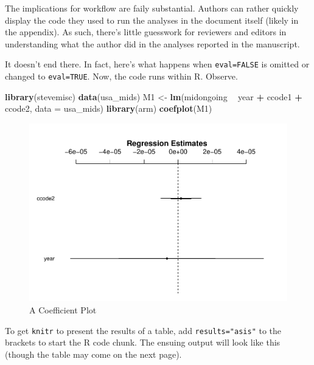 \documentclass[11pt,]{article}
\newenvironment{Shaded}{\begin{snugshade}}{\end{snugshade}}
\newcommand{\DataTypeTok}[1]{\textcolor[rgb]{0.13,0.29,0.53}{#1}}
\newcommand{\KeywordTok}[1]{\textcolor[rgb]{0.13,0.29,0.53}{\textbf{#1}}}
\newcommand{\NormalTok}[1]{#1}
\newcommand{\OperatorTok}[1]{\textcolor[rgb]{0.81,0.36,0.00}{\textbf{#1}}}
\newcommand{\StringTok}[1]{\textcolor[rgb]{0.31,0.60,0.02}{#1}}
\begin{document}
The implications for workflow are faily substantial. Authors can rather
quickly display the code they used to run the analyses in the document
itself (likely in the appendix). As such, there's little guesswork for
reviewers and editors in understanding what the author did in the
analyses reported in the manuscript.

It doesn't end there. In fact, here's what happens when
\texttt{eval=FALSE} is omitted or changed to \texttt{eval=TRUE}. Now,
the code runs within R. Observe.

\begin{Shaded}
\begin{Highlighting}[]
\KeywordTok{library}\NormalTok{(stevemisc)}
\KeywordTok{data}\NormalTok{(usa_mids)}
\NormalTok{M1 <-}\StringTok{ }\KeywordTok{lm}\NormalTok{(midongoing }\OperatorTok{~}\StringTok{ }\NormalTok{year }\OperatorTok{+}\StringTok{ }\NormalTok{ccode1 }\OperatorTok{+}\StringTok{ }\NormalTok{ccode2, }\DataTypeTok{data =}\NormalTok{ usa_mids)}
\KeywordTok{library}\NormalTok{(arm)}
\KeywordTok{coefplot}\NormalTok{(M1)}
\end{Highlighting}
\end{Shaded}

\begin{figure}
\centering
\includegraphics{figs/unnamed-chunk-3.pdf}
\caption{A Coefficient Plot}
\end{figure}

To get \texttt{knitr} to present the results of a table, add
\texttt{results="asis"} to the brackets to start the R code chunk. The
ensuing output will look like this (though the table may come on the
next page).
\end{document}
